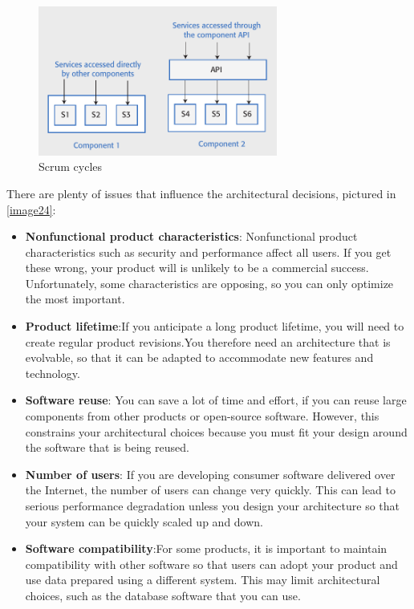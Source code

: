 \documentclass[10pt,a4paper]{report}
\begin{document}
\begin{figure}[h]
	\centering
	\includegraphics[width=0.7\textwidth]{image23}
	\caption{Scrum cycles}
	\label{image23}
\end{figure}
 There are plenty of issues that influence the architectural decisions, pictured in \ref{image24}:
 \begin{itemize}
 	\item \textbf{Nonfunctional product characteristics}: Nonfunctional product characteristics such as security and performance affect all users. If you get these wrong, your product will is unlikely to be a commercial success. Unfortunately, some characteristics are opposing, so you can only optimize the most
 	important.
 	\item \textbf{Product lifetime}:If you anticipate a long product lifetime, you will need to create regular product revisions.You therefore need an architecture that is evolvable, so that it can be adapted to accommodate new features and technology.
 	\item \textbf{Software reuse}:	You can save a lot of time and effort, if you can reuse large components from other products or open-source software. However, this constrains your architectural choices
 	because you must fit your design around the software that is being reused.
 	\item \textbf{Number of users}:	If you are developing consumer software delivered over the Internet, the number of users	can change very quickly. This can lead to serious performance degradation unless you
 	design your architecture so that your system can be quickly scaled up and down.
 	\item \textbf{Software compatibility}:For some products, it is important to maintain compatibility with other software so that users can adopt your product and use data prepared using a different system. This may limit architectural choices, such as the database software that you can use.
 	
 \end{itemize}
\end{document}

